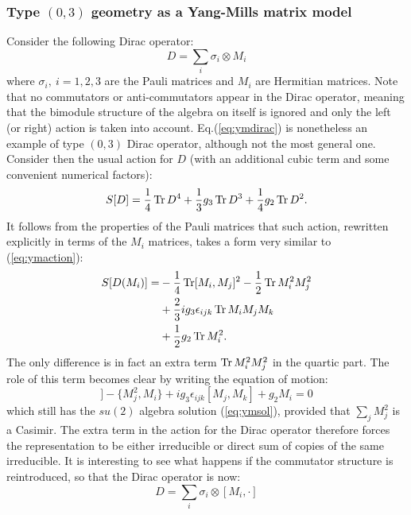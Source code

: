 \subsubsection{Type $(0,3)$ geometry as a Yang-Mills matrix model}
Consider the following Dirac operator:
\begin{equation}\label{eq:ymdirac}
D = \sum_i \sigma_i \otimes M_i
\end{equation}
where $\sigma_i, \ i=1,2,3$ are the Pauli matrices and $M_i$ are Hermitian matrices. Note that no commutators or anti-commutators appear in the Dirac operator, meaning that the bimodule structure of the algebra on itself is ignored and only the left (or right) action is taken into account. Eq.(\ref{eq:ymdirac}) is nonetheless an example of type $(0,3)$ Dirac operator, although not the most general one.\newline
Consider then the usual action for $D$ (with an additional cubic term and some convenient numerical factors):
\begin{equation}
S[D] = \frac{1}{4} \operatorname{Tr} D^4 + \frac{1}{3}g_3 \operatorname{Tr} D^3 + \frac{1}{4}g_2 \operatorname{Tr} D^2.
\end{equation}
It follows from the properties of the Pauli matrices that such action, rewritten explicitly in terms of the $M_i$ matrices, takes a form very similar to (\ref{eq:ymaction}):
\begin{align}
S[D(M_i)] = &-\frac{1}{4} \operatorname{Tr} [M_i, M_j]^2 -\frac{1}{2} \operatorname{Tr} M_i^2 M_j^2 \\ \notag
&+ \frac{2}{3} i g_3 \epsilon_{ijk} \operatorname{Tr} M_i M_j M_k \\ \notag
&+ \frac{1}{2} g_2 \operatorname{Tr} M_i^2.
\end{align}
The only difference is in fact an extra term $\operatorname{Tr} M_i^2 M_j^2$ in the quartic part. The role of this term becomes clear by writing the equation of motion:
\begin{equation}
[M_j, [M_j, M_i]] - \{M_j^2, M_i \} + i g_3 \epsilon_{ijk}[M_j, M_k] + g_2 M_i = 0
\end{equation}
which still has the $su(2)$ algebra solution (\ref{eq:ymsol}), provided that $\sum_j M_j^2$ is a Casimir. The extra term in the action for the Dirac operator therefore forces the representation to be either irreducible or direct sum of copies of the same irreducible.\newline
It is interesting to see what happens if the commutator structure is reintroduced, so that the Dirac operator is now:
\begin{equation}
D = \sum_i \sigma_i \otimes [M_i,\cdot ]
\end{equation}
